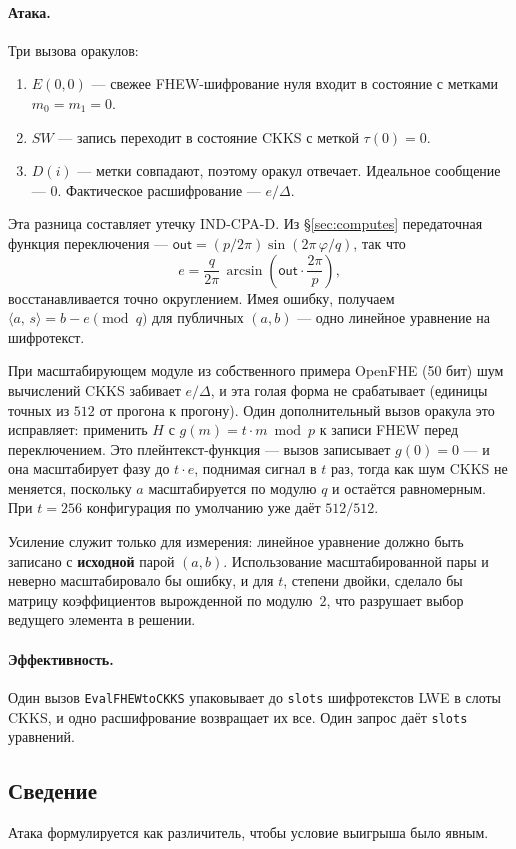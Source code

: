 \documentclass[11pt]{article}
\newcommand{\inner}[2]{\langle #1,\, #2\rangle}
\newcommand{\out}{\mathsf{out}}
\newcommand{\code}[1]{\texttt{#1}}
\begin{document}
\paragraph{Атака.}
Три вызова оракулов:
\begin{enumerate}
  \item $E(0, 0)$ --- свежее FHEW-шифрование нуля входит в состояние с метками $m_0 = m_1 = 0$.
  \item $\mathit{SW}$ --- запись переходит в состояние CKKS с меткой $\tau(0) = 0$.
  \item $D(i)$ --- метки совпадают, поэтому оракул отвечает. Идеальное сообщение --- $0$. Фактическое
    расшифрование --- $e/\Delta$.
\end{enumerate}
Эта разница составляет утечку IND-CPA-D. Из \S\ref{sec:computes} передаточная
функция переключения --- $\out = (p/2\pi)\sin(2\pi\,\varphi/q)$, так что
\[
  e = \frac{q}{2\pi}\,\arcsin\!\left(\out \cdot \frac{2\pi}{p}\right),
\]
восстанавливается точно округлением. Имея ошибку, получаем $\inner{a}{s} = b - e \pmod q$ для
публичных $(a, b)$ --- одно линейное уравнение на шифротекст.

При масштабирующем модуле из собственного примера OpenFHE (50 бит) шум вычислений CKKS забивает
$e/\Delta$, и эта голая форма не срабатывает (единицы точных из $512$ от прогона к прогону). Один
дополнительный вызов оракула это исправляет: применить $H$ с $g(m) = t\cdot m \bmod p$ к записи FHEW
перед переключением. Это плейнтекст-функция --- вызов записывает $g(0) = 0$ --- и она
масштабирует фазу до $t\cdot e$, поднимая сигнал в $t$ раз, тогда как шум CKKS не меняется, поскольку
$a$ масштабируется по модулю $q$ и остаётся равномерным. При $t = 256$ конфигурация по умолчанию уже
даёт $512/512$.

Усиление служит только для измерения: линейное уравнение должно быть записано
с \textbf{исходной} парой $(a, b)$. Использование масштабированной пары и неверно масштабировало бы
ошибку, и для $t$, степени двойки, сделало бы матрицу коэффициентов вырожденной по модулю~$2$, что
разрушает выбор ведущего элемента в решении.

\paragraph{Эффективность.}
Один вызов \code{EvalFHEWtoCKKS} упаковывает до \code{slots} шифротекстов LWE в слоты CKKS, и одно
расшифрование возвращает их все. Один запрос даёт \code{slots} уравнений.

\subsection{Сведение}
Атака формулируется как различитель, чтобы условие выигрыша было явным.
\end{document}
